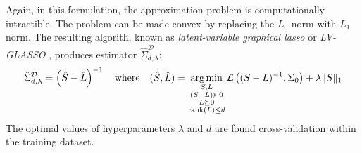Again, in this formulation, the approximation problem is computationally intractible.  The problem can be made convex by replacing the $L_0$ norm with $L_1$ norm. The resulting algorith, known as \emph{latent-variable graphical lasso} or \emph{LV-GLASSO} \cite{Chandrasekaran:2010,Ma:2013}, produces estimator $\hat\Sigma_{d,\lambda}^{\mathcal D}$:
\begin{equation}
\hat\Sigma_{d,\lambda} ^{\mathcal D} = \left(\hat S-\hat L\right)^{-1}
\quad\mbox{where}\quad
(\hat S, \hat L) = \operatorname*{arg\,min}\limits_{\substack{ S,L \\ (S-L)\succ 0 \\ L\succeq 0 \\ \operatorname{rank}(L) \le d}} \mathcal L\left((S-L)^{-1},\Sigma_0\right) + \lambda \| S \|_1 
\end{equation}
The optimal values of hyperparameters $\lambda$ and $d$ are found cross-validation within the training dataset.
